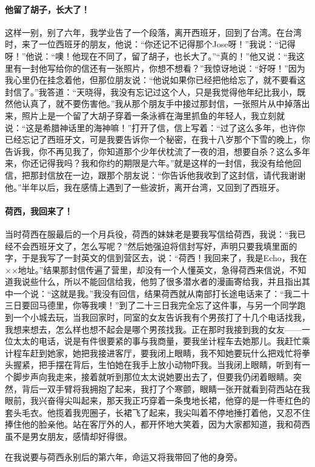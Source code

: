 \paragraph{他留了胡子，长大了！}
\par 这样一别，别了六年，我学业告了一个段落，离开西班牙，回到了台湾。在台湾时，来了一位西班牙的朋友，他说：“你还记不记得那个Jose呀！”我说：“记得呀！”他说：“噢！他现在不同了，留了胡子，也长大了。”“真的！”他又说：“我这里有一封他写给你的信还有一张照片，你想不想看？”我惊讶地说：“好呀！”因为我心里仍在挂念着他，但那位朋友说：“他说如果你已经把他给忘了，就不要看这封信了。”我答道：“天晓得，我没有忘记过这个人，只是我觉得他年纪比我小，既然他认真了，就不要伤害他。”我从那个朋友手中接过那封信，一张照片从中掉落出来，照片上是一个留了大胡子穿着一条泳裤在海里抓鱼的年轻人，我立刻就说：“这是希腊神话里的海神嘛！”打开了信，信上写着：“过了这么多年，也许你已经忘记了西班牙文，可是我要告诉你一个秘密，在我十八岁那个下雪的晚上，你告诉我，你不再见我了，你知道那个少年伏枕流了一夜的泪，想要自杀？这么多年来，你还记得我吗？我和你约的期限是六年。”就是这样的一封信，我没有给他回信，把那封信放在一边，跟那个朋友说：“你告诉他我收到了这封信，请代我谢谢他。”半年以后，我在感情上遇到了一些波折，离开台湾，又回到了西班牙。
\paragraph{荷西，我回来了！}
\par 当时荷西在服最后的一个月兵役，荷西的妹妹老是要我写信给荷西，我说：“我已经不会西班牙文了，怎么写呢？”然后她强迫将信封写好，声明只要我填里面的字，于是我写了一封英文的信到营区去，说：“荷西！我回来了，我是Echo，我在××地址。”结果那封信传遍了营里，却没有一个人懂英文，急得荷西来信说，不知道我说些什么，所以不能回信给我，他剪了很多潜水者的漫画寄给我，并且指出其中一个说：“这就是我。”我没有回信，结果荷西就从南部打长途电话来了：“我二十三日要回马德里，你等我噢！”到了二十三日我完全忘了这件事，与另一个同学跑到一个小城去玩，当我回家时，同室的女友告诉我有个男孩打了十几个电话找我，我想来想去，怎么样也想不起会是哪个男孩找我。正在那时我接到我的女友——一位太太的电话，说是有件很要紧的事与我商量，要我坐计程车去她那儿。我赶忙乘计程车赶到她家，她把我接进客厅，要我闭上眼睛，我不知她要玩什么把戏忙将拳头握紧，把手摆在背后，生怕她在我手上放小动物吓我。当我闭上眼睛，听到有一个脚步声向我走来，接着就听到那位太太说她要出去了，但要我仍闭着眼睛。突然，背后一双手臂将我拥抱了起来，我打了个寒颤，眼睛一张开就看到荷西站在我眼前，我兴奋得尖叫起来，那天我正巧穿着一条曳地长裙，他穿的是一件枣红色的套头毛衣。他揽着我兜圈子，长裙飞了起来，我尖叫着不停地捶打着他，又忍不住捧住他的脸亲他。站在客厅外的人，都开怀地大笑着，因为大家都知道，我和荷西虽不是男女朋友，感情却好得很。
\par 在我说要与荷西永别后的第六年，命运又将我带回了他的身旁。
